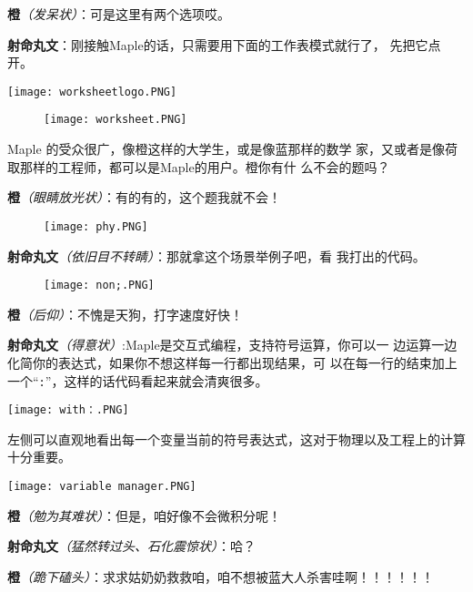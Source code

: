\textbf{橙}\textit{（发呆状）}：可是这里有两个选项哎。

\textbf{射命丸文}：刚接触Maple的话，只需要用下面的工作表模式就行了，
先把它点开。

\begin{center}
    \texttt{[image: worksheetlogo.PNG]}
\end{center}

\begin{figure}[h]
    \centering
    \texttt{[image: worksheet.PNG]}
\end{figure}

Maple 的受众很广，像橙这样的大学生，或是像蓝那样的数学 家，又或者是像荷取那样的工程师，都可以是Maple的用户。橙你有什 么不会的题吗？

\textbf{橙}\textit{（眼睛放光状）}：有的有的，这个题我就不会！%
\begin{figure}[htpb]
    \centering
    \texttt{[image: phy.PNG]}
\end{figure}

\textbf{射命丸文}\textit{（依旧目不转睛）}：那就拿这个场景举例子吧，看
我打出的代码。

\begin{figure}[h]
    \centering
    \texttt{[image: non;.PNG]}
\end{figure}

\textbf{橙}\textit{（后仰）}：不愧是天狗，打字速度好快！

\textbf{射命丸文}\textit{（得意状）}:Maple是交互式编程，支持符号运算，你可以一
边运算一边化简你的表达式，如果你不想这样每一行都出现结果，可
以在每一行的结束加上一个“\verb":"”，这样的话代码看起来就会清爽很多。

\begin{center}
    \texttt{[image: with：.PNG]}
\end{center}

左侧可以直观地看出每一个变量当前的符号表达式，这对于物理以及工程上的计算十分重要。

\begin{center}
    \texttt{[image: variable manager.PNG]}
\end{center}

\textbf{橙}\textit{（勉为其难状）}：但是，咱好像不会微积分呢！

\textbf{射命丸文}\textit{（猛然转过头、石化震惊状）}：哈？

\textbf{橙}\textit{（跪下磕头）}：求求姑奶奶救救咱，咱不想被蓝大人杀害哇啊！！！！！！

